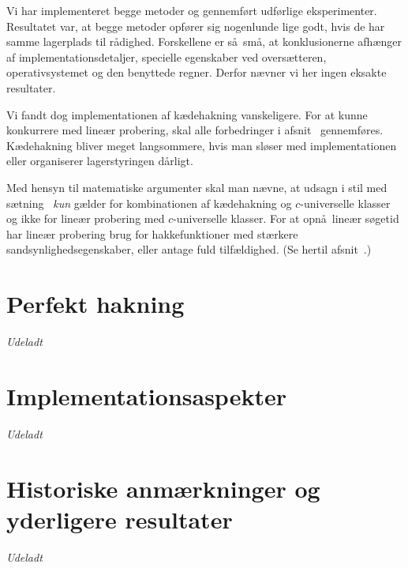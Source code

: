 Vi har implementeret begge metoder og gennemført udførlige eksperimenter.
Resultatet var, at begge metoder opfører sig nogenlunde lige godt, hvis de har samme lagerplads til rådighed.
Forskellene er så små, at konklusionerne afhænger af implementationsdetaljer, specielle egenskaber ved oversætteren, operativsystemet og den benyttede regner.
Derfor nævner vi her ingen eksakte resultater.

Vi fandt dog implementationen af kædehakning vanskeligere.
For at kunne konkurrere med lineær probering, skal alle forbedringer i afsnit~ gennemføres.
Kædehakning bliver meget langsommere, hvis man sløser med implementationen eller organiserer lagerstyringen dårligt.

Med hensyn til matematiske argumenter skal man nævne, at udsagn i stil med sætning~ \emph{kun} gælder for kombinationen af kædehakning og $c$-universelle klasser og ikke for lineær probering med $c$-universelle klasser.
For at opnå lineær søgetid har lineær probering brug for hakkefunktioner med stærkere sandsynlighedsegenskaber, eller antage fuld tilfældighed.
(Se hertil afsnit~.) 

\section{Perfekt hakning}

\emph{Udeladt}

\section{Implementationsaspekter}

\emph{Udeladt}

\section{Historiske anmærkninger og yderligere resultater}

\emph{Udeladt}
